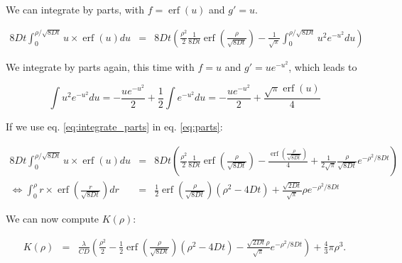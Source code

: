 \documentclass[english]{article}
\DeclareMathOperator\erf{erf}
\begin{document}
We can integrate by parts, with $f=\erf(u)$ and $g'=u$.

\begin{equation}
\begin{array}{ccc}
8Dt\int_{0}^{\rho/\sqrt{8Dt}}u\times\erf\left(u\right)du & = & 8Dt\left(\frac{\rho^{2}}{2}\frac{1}{8Dt}\erf(\frac{\rho}{\sqrt{8Dt}})-\frac{1}{\sqrt{\pi}}\int_{0}^{\rho/\sqrt{8Dt}}u^{2}e^{-u^{2}}du\right)\end{array}\label{eq:parts}
\end{equation}

We integrate by parts again, this time with $f=u$ and $g'=ue^{-u^{2}}$,
which leads to 

\begin{equation}
\int u^{2}e^{-u^{2}}du=-\frac{ue^{-u^{2}}}{2}+\frac{1}{2}\int e^{-u^{2}}du=-\frac{ue^{-u^{2}}}{2}+\frac{\sqrt{\pi}\erf(u)}{4}\label{eq:integrate_parts}
\end{equation}

If we use eq. \ref{eq:integrate_parts} in eq. \ref{eq:parts}:

\begin{equation}
\begin{array}{ccc}
8Dt\int_{0}^{\rho/\sqrt{8Dt}}u\times\erf\left(u\right)du & = & 8Dt\left(\frac{\rho^{2}}{2}\frac{1}{8Dt}\erf(\frac{\rho}{\sqrt{8Dt}})-\frac{\erf(\frac{\rho}{\sqrt{8Dt}})}{4}+\frac{1}{2\sqrt{\pi}}\frac{\rho}{\sqrt{8Dt}}e^{-\rho^{2}/8Dt}\right)\\
\Leftrightarrow\int_{0}^{\rho}r\times\erf\left(\frac{r}{\sqrt{8Dt}}\right)dr & = & \frac{1}{2}\erf(\frac{\rho}{\sqrt{8Dt}})(\rho^{2}-4Dt)+\frac{\sqrt{2Dt}}{\sqrt{\pi}}\rho e^{-\rho^{2}/8Dt}
\end{array}
\end{equation}

We can now compute $K(\rho)$:

\begin{equation}
\begin{array}{ccc}
K(\rho) & = & \frac{\lambda}{CD}\left(\frac{\rho^{2}}{2}-\frac{1}{2}\erf(\frac{\rho}{\sqrt{8Dt}})(\rho^{2}-4Dt)-\frac{\sqrt{2Dt}\rho}{\sqrt{\pi}}e^{-\rho^{2}/8Dt}\right)+\frac{4}{3}\pi\rho^{3}.\end{array}\label{eq:end_K}
\end{equation}



\end{document}

